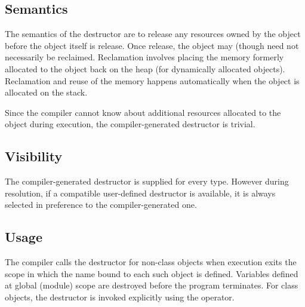 \subsection{Semantics}

The semantics of the destructor are to release any resources owned by the object
before the object itself is release.  Once release, the object may (though need
not necessarily be reclaimed.  Reclamation involves placing the memory formerly
allocated to the object back on the heap (for dynamically allocated objects).
Reclamation and reuse of the memory happens automatically when the object is
allocated on the stack.

Since the compiler cannot know about additional resources allocated to the
object during execution, the compiler-generated destructor is trivial.

\subsection{Visibility}

The compiler-generated destructor is supplied for every type.  However during
resolution, if a compatible user-defined destructor is available, it is always
selected in preference to the compiler-generated one.

\subsection{Usage}

The compiler calls the destructor for non-class objects when execution exits the
scope in which the name bound to each such object is defined.  Variables defined
at global (module) scope are destroyed before the program terminates.  For class
objects, the destructor is invoked explicitly using the  operator.




